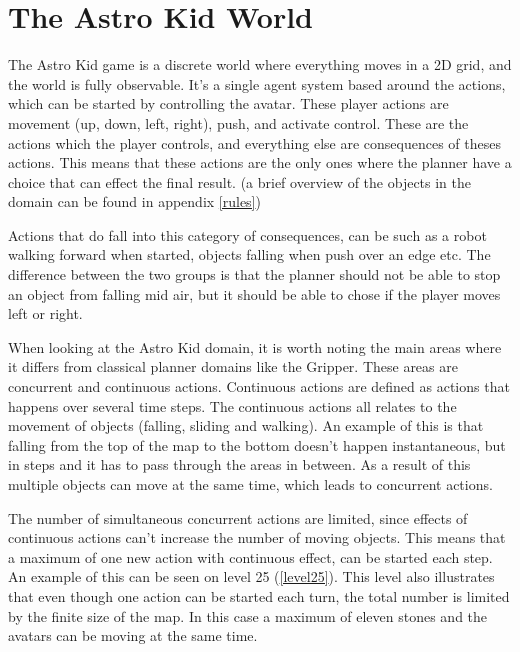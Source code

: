 	\chapter{The Astro Kid World}
	The Astro Kid game is a discrete world where everything moves in a 2D grid, and the world is fully observable. It's a single agent system based around the actions, which can be started by controlling the avatar. These player actions are movement (up, down, left, right), push, and activate control. These are the actions which the player controls, and everything else are consequences of theses actions. This means that these actions are the only ones where the planner have a choice that can effect the final result. (a brief overview of the objects in the domain can be found in appendix \ref{rules})
	
	
	Actions that do fall into this category of consequences, can be such as a robot walking forward when started, objects falling when push over an edge etc. The difference between the two groups is that the planner should not be able to stop an object from falling mid air, but it should be able to chose if the player moves left or right. 
	

	When looking at the Astro Kid domain, it is worth noting the main areas where it differs from classical planner domains like the Gripper. These areas are concurrent and continuous actions. Continuous actions are defined as actions that happens over several time steps. The continuous actions all relates to the movement of objects (falling, sliding and walking). An example of this is that falling from the top of the map to the bottom doesn't happen instantaneous, but in steps and it has to pass through the areas in between. As a result of this multiple objects can move at the same time, which leads to concurrent actions.
	
	The number of simultaneous concurrent actions are limited, since effects of continuous actions can't increase the number of moving objects. This means that a maximum of one new action with continuous effect, can be started each step. An example of this can be seen on level 25 (\ref{level25}). This level also illustrates that even though one action can be started each turn, the total number is limited by the finite size of the map. In this case a maximum of eleven stones and the avatars can be moving at the same time.

